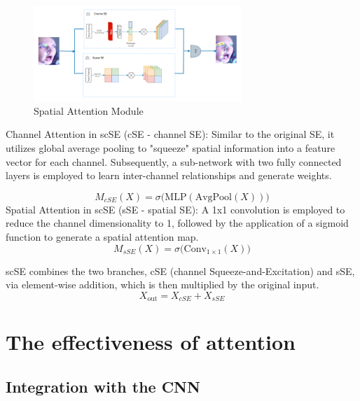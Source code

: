 \documentclass[pdflatex,sn-mathphys-num]{sn-jnl}%
\theoremstyle{thmstyleone}%
\theoremstyle{thmstyletwo}%
\theoremstyle{thmstylethree}%
\begin{document}
\begin{figure}[h]
  \centering
  \includegraphics[width=0.7\textwidth]{Figures/scse2.png}
   \caption{Spatial Attention Module}
  \label{fig:hinh-anh-8}
\end{figure}
Channel Attention in scSE (cSE - channel SE): Similar to the original SE, it utilizes global average pooling to "squeeze" spatial information into a feature vector for each channel. Subsequently, a sub-network with two fully connected layers is employed to learn inter-channel relationships and generate weights.

\begin{equation}\label{eq:scse-channel}
M_{cSE}(X) = \sigma\bigl(\mathrm{MLP}(\mathrm{AvgPool}(X))\bigr)
\end{equation}
Spatial Attention in scSE (sSE - spatial SE): A 1x1 convolution is employed to reduce the channel dimensionality to 1, followed by the application of a sigmoid function to generate a spatial attention map.
\begin{equation}\label{eq:scse-spatial}
M_{sSE}(X) = \sigma\bigl(\mathrm{Conv}_{1\times1}(X)\bigr)
\end{equation}

scSE combines the two branches, cSE (channel Squeeze-and-Excitation) and sSE, via element-wise addition, which is then multiplied by the original input.
\begin{equation}\label{eq:scse-out}
X_{\mathrm{out}} = X_{cSE} + X_{sSE}
\end{equation}
\section{The effectiveness of attention}\label{sec3}
\subsection{Integration with the CNN}
\end{document}
